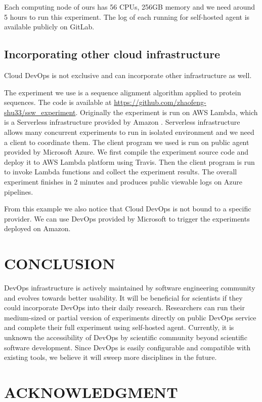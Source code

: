 \documentclass[10pt, conference, compsocconf]{IEEEtran}
\begin{document}
Each computing node of ours has 56 CPUs, 256GB memory and we need around 5 hours to run this experiment. The log of each running for self-hosted agent is available publicly on GitLab.

\subsection{Incorporating other cloud infrastructure}
Cloud DevOps is not exclusive and can incorporate other infrastructure as well.  

The experiment we use is a sequence alignment algorithm applied to protein sequences. 
The code is available at \url{https://github.com/zhaofeng-shu33/ssw_experiment}. Originally the experiment is run on AWS Lambda, which is a Serverless infrastructure provided by Amazon \cite{niu2019leveraging}. Serverless infrastructure allows many concurrent experiments to run in isolated environment and
we need a client to coordinate them. The client program we used is run on public agent provided by Microsoft Azure. We first compile the experiment source code and deploy it to AWS Lambda platform using Travis. Then the client program is run to invoke Lambda functions and collect the experiment results.
The overall experiment finishes in 2 minutes and produces public viewable logs on Azure pipelines. 

From this example we also notice that Cloud DevOps is not bound to a specific provider. We can use DevOps provided by Microsoft to trigger the experiments deployed on Amazon.

\section{CONCLUSION}
DevOps infrastructure is actively maintained by software engineering community and evolves towards better usability. It will be beneficial for scientists if they could incorporate DevOps into their daily research. Researchers can run their medium-sized or partial version of experiments directly on public DevOps service and complete their full experiment using self-hosted agent. Currently, it is unknown the accessibility of DevOps by scientific community beyond scientific software development. Since DevOps is easily configurable and compatible with existing tools, we believe it will sweep more disciplines in the future.

\section{ACKNOWLEDGMENT}





\end{document}
